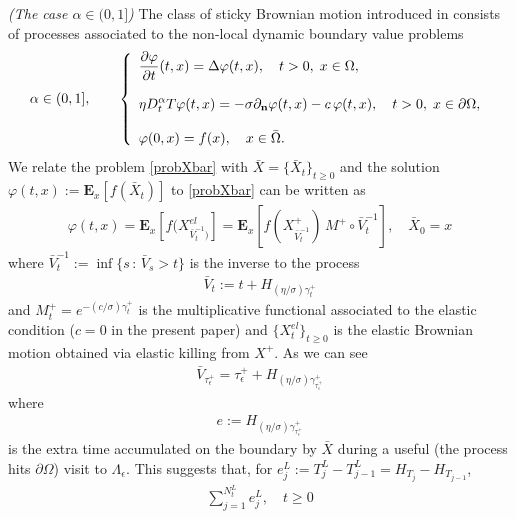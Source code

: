 \documentclass[10pt,a4paper]{article}
\numberwithin{equation}{section}
\theoremstyle{plain}
\theoremstyle{remark}
\begin{document}
{\it (The case $\alpha \in (0,1]$)} The class of sticky Brownian motion introduced in \cite{EJP} consists of processes associated to the non-local dynamic boundary value problems
\begin{align}
\alpha \in (0,1], \qquad \left\lbrace
\begin{array}{l}
\displaystyle \frac{\partial \varphi}{\partial t}(t,x) = \Delta \varphi(t,x), \quad t>0, \; x \in \Omega, \\
\\
\displaystyle \eta D^\alpha_t T \varphi(t,x) = - \sigma \partial_{\bf n} \varphi(t,x) - c \, \varphi(t,x), \quad t>0, \; x \in \partial \Omega,\\
\\
\displaystyle \varphi(0,x) = f(x), \quad x \in \bar{\Omega}.
\end{array}
\right .
\label{probXbar}
\end{align}
We relate the problem \eqref{probXbar} with $\bar{X}=\{\bar{X}_t\}_{t \geq 0}$ and the solution $\varphi(t,x) := \mathbf{E}_x[f(\bar{X}_t)]$ to \eqref{probXbar} can be written as 
\begin{align*}
\varphi(t,x) = \mathbf{E}_x[f(X^{el}_{\bar{V}^{-1}_t)}] = \mathbf{E}_x [f(X^+_{\bar{V}^{-1}_t}) \, M^+ \circ \bar{V}^{-1}_t], \quad \bar{X}_0=x
\end{align*}
where $\bar{V}^{-1}_t := \inf\{ s \, :\, \bar{V}_s > t\}$ is the inverse to the process
\begin{align}
\label{Vbar}
\bar{V}_t := t +  H_{(\eta/\sigma) \gamma^+_t}
\end{align}
and $M^+_t = e^{-(c/\sigma) \gamma^+_t}$ is the multiplicative functional associated to the elastic condition ($c=0$ in the present paper) and $\{X^{el}_t\}_{t\geq 0}$ is the elastic Brownian motion obtained via elastic killing from $X^+$. As we can see 
\begin{align*}
\bar{V}_{\tau^+_\epsilon} = \tau^+_\epsilon + H_{(\eta/\sigma)\gamma^+_{\tau^+_\epsilon}}
\end{align*}
where 
\begin{align*}
e:=H_{(\eta/\sigma)\gamma^+_{\tau^+_\epsilon}}
\end{align*}
is the extra time accumulated on the boundary by $\bar{X}$ during a useful (the process hits $\partial \Omega$) visit to $\Lambda_\epsilon$. This suggests that, for $e^L_j := T^L_j - T^L_{j-1} = H_{T_j} - H_{T_{j-1}}$, 
\begin{align}
\sum_{j=1}^{N^L_t} e^L_j, \quad t\geq 0
\label{equivHXZ}
\end{align}
\end{document}
